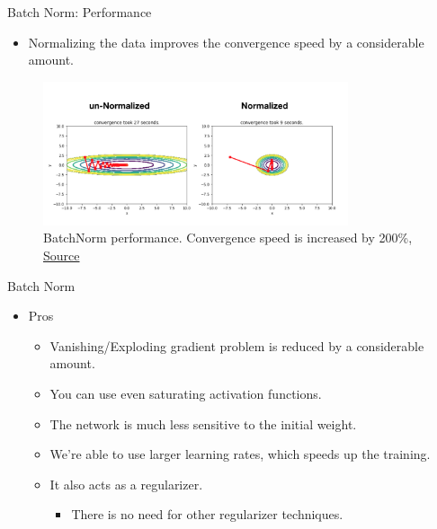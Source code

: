 \documentclass[compress,oilve,t]{beamer}
\begin{document}
\begin{frame}{Batch Norm: Performance}
	\begin{itemize}
		\item Normalizing the data improves the convergence speed by a considerable amount.
	\end{itemize}
	\begin{figure}[H]
		\centering
		\includegraphics[width=0.8\textwidth]{Figs/section_4/batchnorm_3.png}
		\caption{BatchNorm performance. Convergence speed is increased by 200\%,  \href{https://jsideas.net/batch_normalization/}{Source}}
	\end{figure}
\end{frame}
\begin{frame}{Batch Norm}
	\begin{itemize}
		\item Pros
		\medskip
		\begin{itemize}
			\item Vanishing/Exploding gradient problem is reduced by a considerable amount.
			\medskip
			\item You can use even saturating activation functions.
			\medskip
			\item The network is much less sensitive to the initial weight.
			\medskip
			\item We're able to use larger learning rates, which speeds up the training.
			\medskip
			\item It also acts as a regularizer.
			\medskip
			\begin{itemize}
				\item There is no need for other regularizer techniques.
			\end{itemize}
		\end{itemize}
	\end{itemize}
\end{frame}
\end{document}
